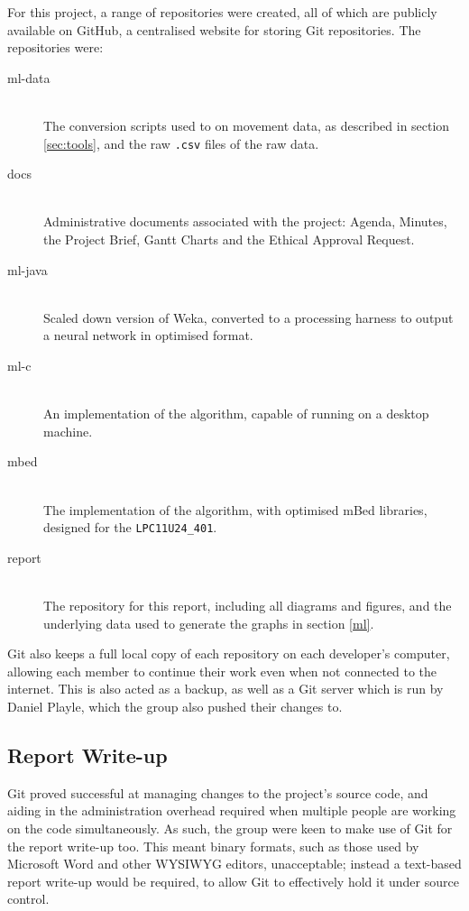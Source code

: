 For this project, a range of repositories were created, all of which are publicly available on GitHub, a centralised website for storing Git repositories. The repositories were:

\begin{description}
    \item[ml-data] \hfill \\ The conversion scripts used to on movement data, as described in section \ref{sec:tools}, and the raw \verb|.csv| files of the raw data.
    \item[docs] \hfill \\ Administrative documents associated with the project: Agenda, Minutes, the Project Brief, Gantt Charts and the Ethical Approval Request.
    \item[ml-java] \hfill \\ Scaled down version of Weka, converted to a processing harness to output a neural network in optimised format.
    \item[ml-c] \hfill \\ An implementation of the algorithm, capable of running on a desktop machine.
    \item[mbed] \hfill \\ The implementation of the algorithm, with optimised mBed libraries, designed for the \verb|LPC11U24_401|.
    \item[report] \hfill \\ The repository for this report, including all diagrams and figures, and the underlying data used to generate the graphs in section \ref{ml}.
\end{description}

Git also keeps a full local copy of each repository on each developer's computer, allowing each member to continue their work even when not connected to the internet. This is also acted as a backup, as well as a Git server which is run by Daniel Playle, which the group also pushed their changes to.

\subsection{Report Write-up}
Git proved successful at managing changes to the project's source code, and aiding in the administration overhead required when multiple people are working on the code simultaneously. As such, the group were keen to make use of Git for the report write-up too. This meant binary formats, such as those used by Microsoft Word and other WYSIWYG editors, unacceptable; instead a text-based report write-up would be required, to allow Git to effectively hold it under source control.

